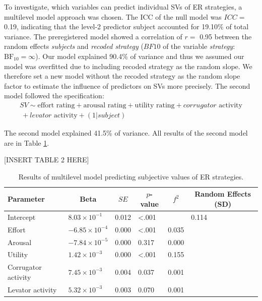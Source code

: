 \documentclass[
  man,floatsintext]{apa6}
\begin{document}
To investigate, which variables can predict individual SVs of ER strategies, a multilevel model approach was chosen.
The ICC of the null model was \(ICC=\) 0.19, indicating that the level-2 predictor subject accounted for 19.10\% of total variance.
The preregistered model showed a correlation of \(r=\) 0.95 between the random effects \emph{subjects} and \emph{recoded strategy} (\(BF10\) of the variable \emph{strategy}: \(\mathrm{BF}_{\textrm{10}} = \infty\)).
Our model explained 90.4\% of variance and thus we assumed our model was overfitted due to including recoded strategy as the random slope.
We therefore set a new model without the recoded strategy as the random slope factor to estimate the influence of predictors on SVs more precisely.
The second model followed the specification:
\[
\begin{split}
SV \sim \text{effort rating} + \text{arousal rating} + \text{utility rating} + corrugator \text{ activity} \\\ + levator \text{ activity} + (1 |subject)
\end{split}
\]

The second model explained 41.5\% of variance.
All results of the second model are in Table \ref{tab:TabMLMH5}.

{[}INSERT TABLE 2 HERE{]}

\begin{table}[H]

\begin{center}
\begin{threeparttable}

\caption{\label{tab:TabMLMH5}Results of multilevel model predicting subjective values of ER strategies.}

\begin{tabular}{llllll}
\toprule
Parameter & \multicolumn{1}{c}{Beta} & \multicolumn{1}{c}{$SE$} & \multicolumn{1}{c}{$p$-value} & \multicolumn{1}{c}{$f^{2}$} & \multicolumn{1}{c}{Random Effects (SD)}\\
\midrule
Intercept & $8.03 \times 10^{-1}$ & 0.012 & <.001 &  & 0.114\\
Effort & $-6.85 \times 10^{-4}$ & 0.000 & <.001 & 0.035 & \\
Arousal & $-7.84 \times 10^{-5}$ & 0.000 & 0.317 & 0.000 & \\
Utility & $1.42 \times 10^{-3}$ & 0.000 & <.001 & 0.155 & \\
Corrugator activity & $7.45 \times 10^{-3}$ & 0.004 & 0.037 & 0.001 & \\
Levator activity & $5.32 \times 10^{-3}$ & 0.003 & 0.070 & 0.001 & \\
\bottomrule
\end{tabular}

\end{threeparttable}
\end{center}

\end{table}
\end{document}
